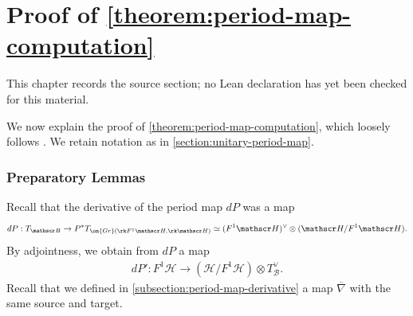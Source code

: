 \chapter{Proof of \autoref{theorem:period-map-computation}}
\label{canonical-representations-surface-groups-chapter-11}

\begin{remark}
\label{canonical-representations-surface-groups-chapter-11-source}
This chapter records the source section; no Lean declaration has yet been checked for this material.
\notready
\end{remark}

\label{appendix}
We now explain the proof of \autoref{theorem:period-map-computation}, which loosely follows \cite[\S9 and \S10]{Voisin:hodgeTheory}. We retain notation as in \autoref{section:unitary-period-map}.
\subsection{Preparatory Lemmas}
Recall that the derivative of the period map $dP$ was a map 	$$dP : T_{\mathscr B} \to P^* T_{\on{Gr}(\rk F^1 \mathscr H, \rk \mathscr H)} \simeq (F^1
	\mathscr H)^\vee \otimes (\mathscr H/F^1 \mathscr H).$$
By adjointness, we obtain from $dP$ a map
\begin{align*}
	dP' : F^1 \mathscr H \to
	(\mathscr H/F^1 \mathscr H) \otimes T_{\mathscr B}^\vee.
\end{align*}
Recall that we defined in \autoref{subsection:period-map-derivative} a map $\overline{\nabla}$ with the same source and target.

